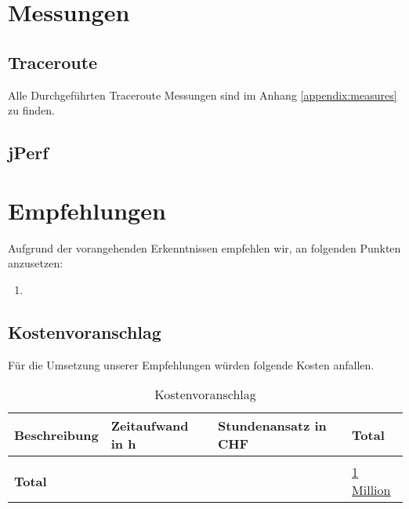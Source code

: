 \section{Messungen}
\subsection{Traceroute}
Alle Durchgeführten Traceroute Messungen sind im Anhang \ref{appendix:measures} zu finden.




\subsection{jPerf}




\section{Empfehlungen}
Aufgrund der vorangehenden Erkenntnissen empfehlen wir, an folgenden Punkten anzusetzen:
\begin{enumerate}
	\item 
\end{enumerate}

\subsection{Kostenvoranschlag}
Für die Umsetzung unserer Empfehlungen würden folgende Kosten anfallen.
\begin{table}[h]
	\centering
	\begin{tabu} to \linewidth {l l l l}
		\toprule 
		Beschreibung & Zeitaufwand in h  & Stundenansatz in CHF & Total \\
		\midrule
		&&& \\
		\textbf{Total} & & & \underline{\underline{1 Million}} \\
		\bottomrule 
	\end{tabu} 
	\caption{Kostenvoranschlag}
\end{table}

